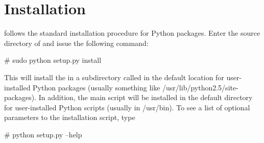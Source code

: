\chapter{Installation}
\label{installation}

\package{} follows the standard installation procedure for Python
packages. Enter the source directory of \package{} and issue the
following command:
\begin{code}
# sudo python setup.py install
\end{code}

This will install the \package{} in a subdirectory called 
in the default location for user-installed Python packages (usually
something like /usr/lib/python2.5/site-packages). In addition, the
main script  will be installed in the default directory
for user-installed Python scripts (usually in /usr/bin).  To see a
list of optional parameters to the installation script, type
\begin{code}
# python setup.py --help
\end{code}

